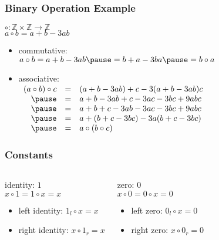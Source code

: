 \documentclass[dvipsnames]{beamer}
\begin{document}
\begin{frame}
  \frametitle{Binary Operation Example}

  \begin{example}
    $\circ: \mathbb{Z} \times \mathbb{Z} \rightarrow \mathbb{Z}$\\
    $a \circ b = a + b - 3ab$

    \pause
    \medskip
    \begin{itemize}
      \item commutative:\\
        $a \circ b = a + b - 3ab \pause
                   = b + a - 3ba \pause
                   = b \circ a$

      \pause
      \medskip
      \item associative:\\
        $\begin{array}{rcl}
          (a \circ b) \circ c & = & (a + b - 3ab) + c - 3 (a + b - 3ab) c\\ \pause
                              & = & a + b - 3ab + c - 3ac - 3bc + 9abc\\ \pause
                              & = & a + b + c - 3ab - 3ac - 3bc + 9abc\\ \pause
                              & = & a + (b + c - 3bc) - 3 a (b + c - 3bc)\\ \pause
                              & = & a \circ (b \circ c)
        \end{array}$
     \end{itemize}
 \end{example}
\end{frame}

\begin{frame}
  \frametitle{Constants}

  \begin{columns}
    \begin{definition}
      \alert{identity}: $1$\\
      $x \circ 1 = 1 \circ x = x$

      \begin{itemize}
        \item left identity: $1_l \circ x = x$
        \item right identity: $x \circ 1_r = x$
      \end{itemize}
    \end{definition}

    \pause
    \begin{definition}
      \alert{zero}: $0$\\
      $x \circ 0 = 0 \circ x = 0$

      \begin{itemize}
        \item left zero: $0_l \circ x = 0$
        \item right zero: $x \circ 0_r = 0$
      \end{itemize}
    \end{definition}
  \end{columns}
\end{frame}
\end{document}
